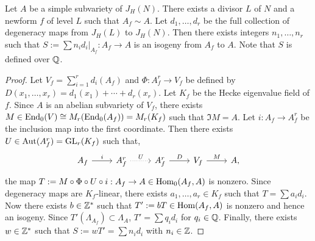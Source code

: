 \documentclass{article}
\begin{document}
\begin{proposition}
    \label{prop:integral_degen}
    Let $A$ be a simple subvariety of $J_H(N)$. There exists a divisor $L$ of
    $N$ and a newform $f$ of level $L$ such that $A_f \sim A$. Let
    $d_1,\ldots,d_r$ be the full collection of degeneracy maps from $J_H(L)$ to
    $J_H(N)$. Then there exists integers $n_1,\ldots,n_r$ such that $S:=\sum
    n_i d_i|_{A_f}: A_f\to A$ is an isogeny from $A_f$ to $A$. Note that $S$ is
    defined over $\mathbb{Q}$.
\end{proposition}
\begin{proof}
    Let $V_f=\sum_{i=1} ^r d_i(A_f)$ and $\Phi:A_f ^r \to V_f$ be defined by
    $D(x_1,\ldots,x_r) = d_1(x_1)+\cdots+d_r(x_r)$. Let $K_f$ be the Hecke
    eigenvalue field of $f$. Since $A$ is an abelian subvariety of $V_f$, there
    exists $M\in \operatorname{End}_0(V)\cong M_r(\operatorname{End}_0(A_f)) = M_r (K_f)$ such that $\Im M
    = A$. Let $i:A_f\to A_f ^r$ be the inclusion map into the first coordinate.
    Then there exists $U\in \operatorname{Aut}(A_f ^r)=\operatorname{GL}_r (K_f)$ such that,
    \[
        \begin{tikzcd}
            A_f \arrow[r,"i"] &
            A_f ^r \arrow[r, dotted, "U"] &
            A_f ^r \arrow[r, "D"] &
            V_f \arrow[r, "M"] &
            A,
        \end{tikzcd}
    \]
    the map $T:=M \circ \Phi \circ U\circ i:A_f\to A\in \operatorname{Hom}_0(A_f, A)$ is
    nonzero. Since degeneracy maps are $K_f$-linear, there exists
    $a_1,\ldots,a_r\in K_f$ such that $T = \sum a_i d_i$. Now there exists
    $b\in \mathbb{Z}^*$ such that $T':=bT\in \operatorname{Hom}(A_f, A)$ is nonzero and hence an
    isogeny. Since $T'(\Lambda_{A_f})\subset \Lambda_A$, $T'=\sum q_i d_i$
    for $q_i\in \mathbb{Q}$. Finally, there exists $w\in \mathbb{Z}^*$ such that
    $S:=wT'=\sum n_i d_i$ with $n_i\in \mathbb{Z}$.
\end{proof}

\end{document}
